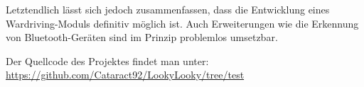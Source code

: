 \documentclass[a4paper,11pt, ngerman]{scrartcl}
\begin{document}
Letztendlich lässt sich jedoch zusammenfassen, dass die Entwicklung eines Wardriving-Moduls definitiv möglich ist. Auch Erweiterungen wie die Erkennung von Bluetooth-Geräten sind im Prinzip problemlos umsetzbar.

Der Quellcode des Projektes findet man unter:
\url{https://github.com/Cataract92/LookyLooky/tree/test}
\nocite{*}
\end{document}
